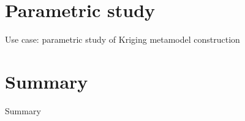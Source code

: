 \documentclass[]{rsuqbeamernew}
\begin{document}
\section{Parametric study}
\begin{frame}[fragile]{Use case: parametric study of Kriging metamodel construction}
\end{frame}

\section{Summary}
\begin{frame}[fragile]{Summary}
\end{frame}
\end{document}
